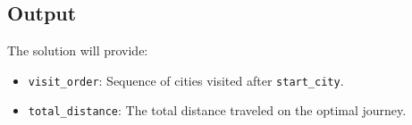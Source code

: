 \documentclass{article}
\begin{document}
\subsection*{Output}
The solution will provide:
\begin{itemize}
    \item \texttt{visit\_order}: Sequence of cities visited after \texttt{start\_city}.
    \item \texttt{total\_distance}: The total distance traveled on the optimal journey.
\end{itemize}
\end{document}

